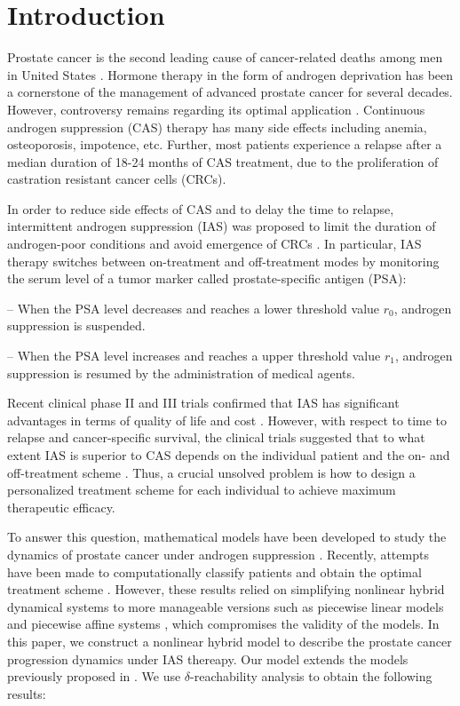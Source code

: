 \section{Introduction}
Prostate cancer is the second leading cause of cancer-related deaths among men in United States \citep{cancerstat}. Hormone therapy in the form of androgen deprivation has been a cornerstone of the management of advanced prostate cancer for several decades. However, controversy remains regarding its optimal application \citep{nru}. Continuous androgen suppression (CAS) therapy has many side effects including anemia, osteoporosis, impotence, etc. Further, most patients experience a relapse after a median duration of 18-24 months of CAS treatment, due to the proliferation of castration resistant cancer cells (CRCs).

In order to reduce side effects of CAS and to delay the time to relapse, intermittent androgen suppression (IAS) was proposed to limit the duration of androgen-poor conditions and avoid emergence of CRCs \citep{bruchovsky95}. In particular, IAS therapy switches between on-treatment and off-treatment modes by monitoring the serum level of a tumor marker called prostate-specific antigen (PSA):

-- When the PSA level decreases and reaches a lower threshold value $r_0$, androgen suppression is suspended.

-- When the PSA level increases and reaches a upper threshold value $r_1$, androgen suppression is resumed by the administration of medical agents.

Recent clinical phase II and III trials confirmed that IAS has significant advantages in terms of quality of life and cost \cite{bruchovsky06,bruchovsky07}. However, with respect to time to relapse and cancer-specific survival, the clinical trials suggested that to what extent IAS is superior to CAS depends on the individual patient and the on- and off-treatment scheme \citep{bruchovsky06,bruchovsky07,book13}. Thus, a crucial unsolved problem is how to design a personalized treatment scheme for each individual to achieve maximum therapeutic efficacy.

To answer this question, mathematical models have been developed to study the dynamics of prostate cancer under androgen suppression \citep{jackson04a,jackson04b,ideta08,hirata10,pnas11,portz12}. Recently, attempts have been made to computationally classify patients and obtain the optimal treatment scheme \citep{chaos10,suzuki10}. However, these results relied on simplifying nonlinear hybrid dynamical systems to more manageable versions such as piecewise linear models \citep{chaos10} and piecewise affine systems \citep{suzuki10}, which compromises the validity of the models. In this paper, we construct a nonlinear hybrid model to describe the prostate cancer progression dynamics under IAS thereapy. Our model extends the models previously proposed in \citep{jackson04a,jackson04b,ideta08}. We use $\delta$-reachability analysis to obtain the following results:

